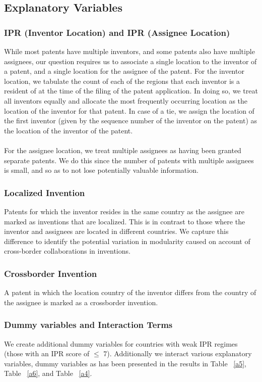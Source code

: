 \documentclass[12pt]{article}
\begin{document}
\subsection{Explanatory Variables}
\subsubsection{IPR (Inventor Location) and IPR (Assignee Location)}
While most patents have multiple inventors, and some patents also have multiple assignees, our question requires us to associate a single location to the inventor of a patent, and a single location for the assignee of the patent. For the inventor location, we tabulate the count of each of the regions that each inventor is a resident of at the time of the filing of the patent application. In doing so, we treat all inventors equally and allocate the most frequently occurring location as the location of the inventor for that patent. In case of a tie, we assign the location of the first inventor (given by the sequence number of the inventor on the patent) as the location of the inventor of the patent. 
\\\\
For the assignee location, we treat multiple assignees as having been granted separate patents. We do this since the number of patents with multiple assignees is small, and so as to not lose potentially valuable information.

\subsubsection{Localized Invention}
Patents for which the inventor resides in the same country as the assignee are marked as inventions that are localized. This is in contrast to those where the inventor and assignees are located in different countries. We capture this difference to identify the potential variation in modularity caused on account of cross-border collaborations in inventions. 

\subsubsection{Crossborder Invention}
A patent in which the location country of the inventor differs from the country of the assignee is marked as a crossborder invention.

\subsubsection{Dummy variables and Interaction Terms}
We create additional dummy variables for countries with weak IPR regimes (those with an IPR score of $\leq$ 7). Additionally we interact various explanatory variables, dummy variables as has been presented in the results in Table ~\ref{a5}, Table ~\ref{a6}, and Table ~\ref{a4}.

\end{document}
